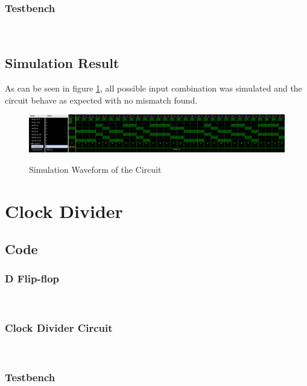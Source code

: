 \documentclass{article}
\begin{document}
\subsubsection*{Testbench}

\;\\
\subsection*{Simulation Result}
As can be seen in figure \ref{fig:2}, all possible input combination was simulated and the circuit behave as expected with no mismatch found.
\begin{figure}[H]
  \centering
  \caption{Simulation Waveform of the Circuit}
  \includegraphics[width=\textwidth]{ECE4304_Midterm1_2_sim.png}
  \label{fig:2}
\end{figure}

\section{Clock Divider}

\subsection*{Code}
\subsubsection*{D Flip-flop}

\;\\
\subsubsection*{Clock Divider Circuit}

\;\\
\subsubsection*{Testbench}

\;\\
\end{document}
